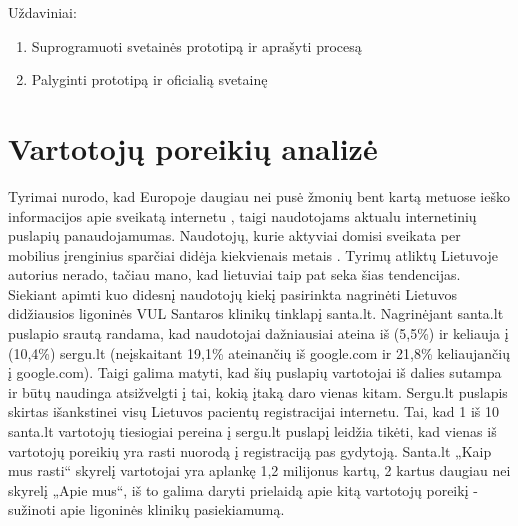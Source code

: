 \documentclass{VUMIFPSbakalaurinis}
\begin{document}
Uždaviniai:
\begin{enumerate}
	\item Suprogramuoti svetainės prototipą ir aprašyti procesą
	\item Palyginti prototipą ir oficialią svetainę
\end{enumerate}

\section{Vartotojų poreikių analizė}
Tyrimai nurodo, kad Europoje daugiau nei pusė žmonių bent kartą metuose ieško informacijos apie sveikatą internetu \cite{EuCitizDigHealthEn}, taigi naudotojams aktualu internetinių puslapių panaudojamumas. Naudotojų, kurie aktyviai domisi sveikata per mobilius įrenginius sparčiai didėja kiekvienais metais \cite{EmergingmHealthEn}. Tyrimų atliktų Lietuvoje autorius nerado, tačiau mano, kad lietuviai taip pat seka šias tendencijas. Siekiant apimti kuo didesnį naudotojų kiekį pasirinkta nagrinėti Lietuvos didžiausios ligoninės VUL Santaros klinikų tinklapį santa.lt. Nagrinėjant santa.lt puslapio srautą randama, kad naudotojai dažniausiai ateina iš (5,5\%) ir keliauja į (10,4\%) sergu.lt (neįskaitant 19,1\% ateinančių iš google.com ir 21,8\% keliaujančių į google.com)\cite{AlexaSantaEn}. Taigi galima matyti, kad šių puslapių vartotojai iš dalies sutampa ir būtų naudinga atsižvelgti į tai, kokią įtaką daro vienas kitam. Sergu.lt puslapis skirtas išankstinei visų Lietuvos pacientų registracijai internetu. Tai, kad 1 iš 10 santa.lt vartotojų tiesiogiai pereina į sergu.lt puslapį leidžia tikėti, kad vienas iš vartotojų poreikių yra rasti nuorodą į registraciją pas gydytoją. Santa.lt „Kaip mus rasti“ skyrelį vartotojai yra aplankę 1,2 milijonus kartų\cite{VulSkKaipMusRastiLt}, 2 kartus daugiau nei skyrelį „Apie mus“\cite{VulSkApieMusLt}, iš to galima daryti prielaidą apie kitą vartotojų poreikį - sužinoti apie ligoninės klinikų pasiekiamumą.

\end{document}
